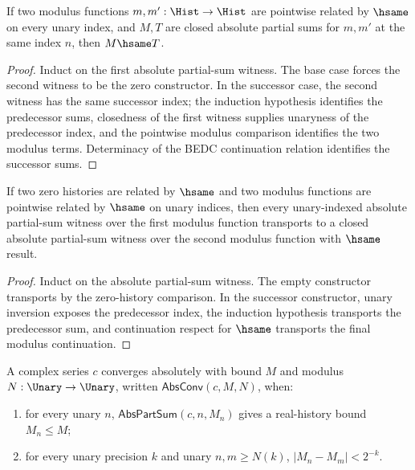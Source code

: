 \begin{lemma}
\label{lem:complex-abs-part-sum-modulus-hsame-deterministic}
If two modulus functions \(m,m':\Hist\to\Hist\) are pointwise related by
\(\hsame\) on every unary index, and \(M,T\) are closed absolute partial sums
for \(m,m'\) at the same index \(n\), then \(M\hsame T\).
\end{lemma}
\begin{proof}
Induct on the first absolute partial-sum witness. The base case forces the
second witness to be the zero constructor. In the successor case, the second
witness has the same successor index; the induction hypothesis identifies the
predecessor sums, closedness of the first witness supplies unaryness of the
predecessor index, and the pointwise modulus comparison identifies the two
modulus terms. Determinacy of the BEDC continuation relation identifies the
successor sums.
\end{proof}

\begin{lemma}
\label{lem:complex-abs-partsum-modulus-hsame-transport}
If two zero histories are related by $\hsame$ and two modulus functions are
pointwise related by $\hsame$ on unary indices, then every unary-indexed
absolute partial-sum witness over the first modulus function transports to a
closed absolute partial-sum witness over the second modulus function with
$\hsame$ result.
\end{lemma}
\begin{proof}
Induct on the absolute partial-sum witness. The empty constructor transports
by the zero-history comparison. In the successor constructor, unary inversion
exposes the predecessor index, the induction hypothesis transports the
predecessor sum, and continuation respect for $\hsame$ transports the final
modulus continuation.
\end{proof}

\begin{definition}
\label{def:abs-conv}
A complex series \(c\) converges absolutely with bound \(M\) and modulus \(N : \Unary \to \Unary\), written \(\mathsf{AbsConv}(c, M, N)\), when:
\begin{enumerate}
  \item for every unary \(n\), \(\mathsf{AbsPartSum}(c, n, M_n)\) gives a real-history bound \(M_n \leq M\);
  \item for every unary precision \(k\) and unary \(n, m \geq N(k)\), \(|M_n - M_m| < 2^{-k}\).
\end{enumerate}
\end{definition}

